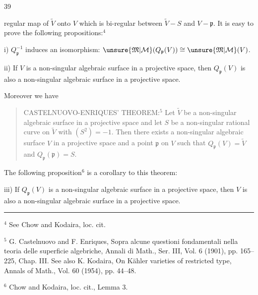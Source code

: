 \begin{center}39\end{center}
regular map of $\widetilde V$ onto $V$ which is bi-regular between $\widetilde V-S$ and $V-\mathfrak p$. It is easy to prove the following propositions:$^4$

i) $Q_{\mathfrak p}^{-1}$ induces an isomorphism: $\unsure{\mathfrak M|\mathcal M}(Q_{\mathfrak p}(V))\cong\unsure{\mathfrak M|\mathcal M}(V)$.

ii) If $V$ is a non-singular algebraic surface in a projective space, then $Q_{\mathfrak p}(V)$ is also a non-singular algebraic surface in a projective space.

Moreover we have

\begin{quote}
CASTELNUOVO-ENRIQUES' THEOREM:$^5$ Let $\widetilde V$ be a non-singular algebraic surface in a projective space and let $S$ be a non-singular rational curve on $\widetilde V$ with $(S^2)=-1$. Then there exists a non-singular algebraic surface $V$ in a projective space and a point $\mathfrak p$ on $V$ such that $Q_{\mathfrak p}(V)=\widetilde V$ and $Q_{\mathfrak p}(\mathfrak p)=S$.
\end{quote}

The following proposition$^6$ is a corollary to this theorem:

iii) If $Q_{\mathfrak p}(V)$ is a non-singular algebraic surface in a projective space, then $V$ is also a non-singular algebraic surface in a projective space.

\noindent\rule{.28\linewidth}{.4pt}

${}^4$ See Chow and Kodaira, loc. cit.

${}^5$ G. Castelnuovo and F. Enriques, Sopra alcune questioni fondamentali nella teoria delle superficie algebriche, Annali di Math., Ser. III, Vol. 6 (1901), pp. 165--225, Chap. III. See also K. Kodaira, On Kähler varieties of restricted type, Annals of Math., Vol. 60 (1954), pp. 44--48.

${}^6$ Chow and Kodaira, loc. cit., Lemma 3.

